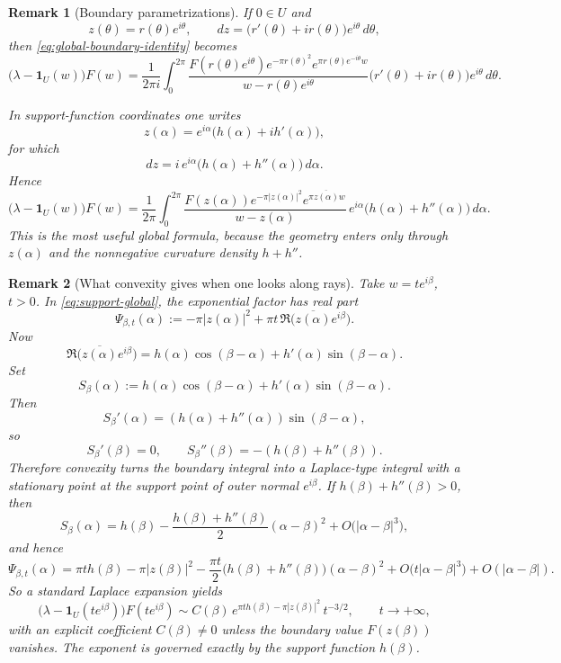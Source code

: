\documentclass[a4paper,11pt,reqno]{amsart}
\newtheorem{remark}{Remark}[section]
\begin{document}
\begin{remark}[Boundary parametrizations]
If \(0\in U\) and
\[
z(\theta)=r(\theta)e^{i\theta},
\qquad
dz=\bigl(r'(\theta)+ir(\theta)\bigr)e^{i\theta}\,d\theta,
\]
then \eqref{eq:global-boundary-identity} becomes
\[
\bigl(\lambda-\mathbf 1_U(w)\bigr)F(w)
=
\frac{1}{2\pi i}\int_0^{2\pi}
\frac{
F(r(\theta)e^{i\theta})e^{-\pi r(\theta)^2}e^{\pi r(\theta)e^{-i\theta}w}}
{w-r(\theta)e^{i\theta}}
\bigl(r'(\theta)+ir(\theta)\bigr)e^{i\theta}\,d\theta.
\]

In support-function coordinates one writes
\[
z(\alpha)=e^{i\alpha}\bigl(h(\alpha)+ih'(\alpha)\bigr),
\]
for which
\[
dz=i\,e^{i\alpha}\bigl(h(\alpha)+h''(\alpha)\bigr)\,d\alpha.
\]
Hence
\begin{equation}\label{eq:support-global}
\bigl(\lambda-\mathbf 1_U(w)\bigr)F(w)
=
\frac{1}{2\pi}\int_0^{2\pi}
\frac{F(z(\alpha))e^{-\pi|z(\alpha)|^2}e^{\pi\overline{z(\alpha)}w}}
{w-z(\alpha)}\,e^{i\alpha}\bigl(h(\alpha)+h''(\alpha)\bigr)\,d\alpha.
\end{equation}
This is the most useful global formula, because the geometry enters only
through \(z(\alpha)\) and the nonnegative curvature density \(h+h''\).
\end{remark}

\begin{remark}[What convexity gives when one looks along rays]
Take \(w=t e^{i\beta}\), \(t>0\). In \eqref{eq:support-global}, the exponential
factor has real part
\[
\Psi_{\beta,t}(\alpha)
:=
-\pi|z(\alpha)|^2+\pi t\,\Re\!\bigl(\overline{z(\alpha)}e^{i\beta}\bigr).
\]
Now
\[
\Re\!\bigl(\overline{z(\alpha)}e^{i\beta}\bigr)
=
h(\alpha)\cos(\beta-\alpha)+h'(\alpha)\sin(\beta-\alpha).
\]
Set
\[
S_\beta(\alpha):=
h(\alpha)\cos(\beta-\alpha)+h'(\alpha)\sin(\beta-\alpha).
\]
Then
\[
S_\beta'(\alpha)=(h(\alpha)+h''(\alpha))\sin(\beta-\alpha),
\]
so
\[
S_\beta'(\beta)=0,
\qquad
S_\beta''(\beta)=-(h(\beta)+h''(\beta)).
\]
Therefore convexity turns the boundary integral into a Laplace-type integral
with a stationary point at the support point of outer normal \(e^{i\beta}\). If
\(h(\beta)+h''(\beta)>0\), then
\[
S_\beta(\alpha)
=
h(\beta)-\frac{h(\beta)+h''(\beta)}{2}(\alpha-\beta)^2
+O\bigl(|\alpha-\beta|^3\bigr),
\]
and hence
\[
\Psi_{\beta,t}(\alpha)
=
\pi t h(\beta)-\pi|z(\beta)|^2
-\frac{\pi t}{2}\bigl(h(\beta)+h''(\beta)\bigr)(\alpha-\beta)^2
+O\bigl(t|\alpha-\beta|^3\bigr)+O(|\alpha-\beta|).
\]
So a standard Laplace expansion yields
\[
\bigl(\lambda-\mathbf 1_U(te^{i\beta})\bigr)F(te^{i\beta})
\sim
C(\beta)\,e^{\pi t h(\beta)-\pi|z(\beta)|^2}\,t^{-3/2},
\qquad t\to+\infty,
\]
with an explicit coefficient \(C(\beta)\neq 0\) unless the boundary value
\(F(z(\beta))\) vanishes. The exponent is governed exactly by the support
function \(h(\beta)\).
\end{remark}
\end{document}
